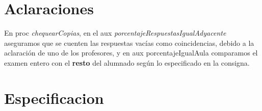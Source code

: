 \documentclass[11pt,a4paper]{article}
\begin{document}
\maketitle

\section{Aclaraciones}

En proc \textit{chequearCopias}, en el aux \textit{porcentajeRespuestasIgualAdyacente} aseguramos que se cuenten las respuestas vacías como coincidencias, debido a la aclaración de uno de los profesores, y en aux porcentajeIgualAula comparamos el examen entero con el \textbf{resto} del alumnado según lo especificado en la consigna.

\section{Especificacion}
\end{document}
